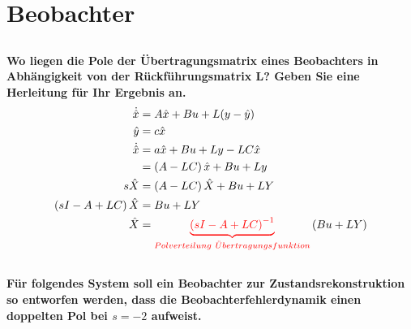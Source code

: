 \section{Beobachter}
\subsection{}
\textbf{Wo liegen die Pole der Übertragungsmatrix eines Beobachters in Abhängigkeit von der Rückführungsmatrix L? Geben Sie eine Herleitung für Ihr Ergebnis an.}
\begin{equation}
    \begin{aligned}
        \dot{\hat{x}}               & =A\hat{x}+Bu+L(y-\hat{y})                                                                                               \\
        \hat{y}                     & =c\hat{x}                                                                                                               \\
        \dot{\hat{x}}               & =a\hat{x}+Bu+Ly-LC\hat{x}                                                                                               \\
                                    & =\left(A-LC\right)\hat{x}+Bu+Ly                                                                                         \\
        s\hat{X}                    & =\left(A-LC\right)\hat{X}+Bu+LY                                                                                         \\
        \left(sI-A+LC\right)\hat{X} & =Bu+LY                                                                                                                  \\
        \hat{X}                     & =\textcolor{red}{\underbrace{\left(sI-A+LC\right)^{-1}}_{Polverteilung\ \ddot{U}bertragungsfunktion}}\left(Bu+LY\right) \\
    \end{aligned}
\end{equation}

\subsection{}
\textbf{Für folgendes System soll ein Beobachter zur Zustandsrekonstruktion so entworfen werden, dass die Beobachterfehlerdynamik einen doppelten Pol bei $s=-2$ aufweist.}

